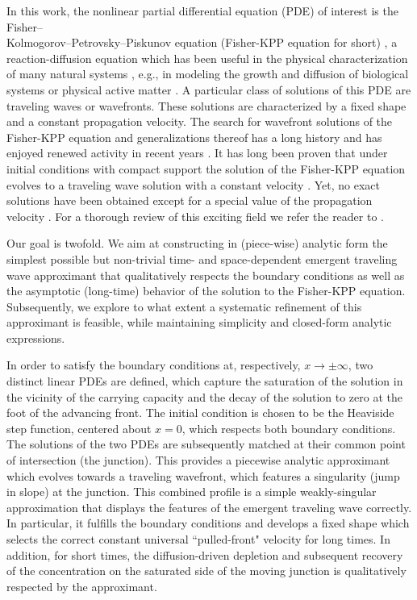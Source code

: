 \documentclass[amsmath,amssymb,amsfonts,aps,pre,preprint,superscriptaddress,showpacs,showkeys,longbibliography,nofootinbib]{revtex4-1}
\begin{document}
In this work, the nonlinear partial differential equation (PDE) of interest is the Fisher–\\Kolmogorov–Petrovsky–Piskunov equation (Fisher-KPP equation for short) \cite{fisher1937wave, kolmogorov1937study}, a reaction-diffusion equation which has been useful in the physical characterization of many natural systems \cite{canosa1973nonlinear,ross2010generalized,hamel2011speedup, Bewick2017Invasion, Demaerel_2019}, e.g., in modeling the growth and diffusion of biological systems or physical active matter \cite{fisher1937wave}. A particular class of solutions of this PDE are traveling waves or wavefronts. These solutions are characterized by a fixed shape and a constant propagation velocity. The search for wavefront solutions of the Fisher-KPP equation and generalizations thereof has a long history and has enjoyed renewed activity in recent years \cite{Mishra2012,Mansour2010,Yuan2013general}.  It has long been proven that under initial conditions with compact support the solution of the Fisher-KPP equation evolves to a traveling wave solution with a constant velocity \cite{kolmogorov1937study, bramson1983,Roberts13}. Yet, no exact solutions have been obtained except for a special value of the propagation velocity \cite{Ablowitz1979}. For a thorough review of this exciting field we refer the reader to \cite{VANSAARLOOS200329}.

Our goal is twofold. We aim at constructing in (piece-wise) analytic form the simplest possible but non-trivial time- and space-dependent emergent traveling wave approximant that qualitatively respects the boundary conditions as well as the asymptotic (long-time) behavior of the solution to the Fisher-KPP equation. Subsequently, we explore to what extent a systematic refinement of this approximant is feasible, while maintaining simplicity and closed-form analytic expressions. 

In order to satisfy the boundary conditions at, respectively, $x\to\pm\infty$, two distinct linear PDEs are defined, which capture the saturation of the solution in the vicinity of the carrying capacity and the decay of the solution to zero at the foot of the advancing front. The initial condition is chosen to be the Heaviside step function, centered about $x=0$, which respects both boundary conditions. The solutions of the two PDEs are subsequently matched at their common point of intersection (the junction). This provides a piecewise analytic approximant which evolves towards a traveling wavefront, which features a singularity (jump in slope) at the junction. This combined profile is a simple weakly-singular approximation that displays the features of the emergent traveling wave correctly. In particular, it fulfills the boundary conditions and develops a fixed shape which selects the correct constant universal ``pulled-front" velocity for long times. In addition, for short times, the diffusion-driven depletion and subsequent recovery of the concentration on the saturated side of the moving junction is qualitatively respected by the approximant.
\end{document}

